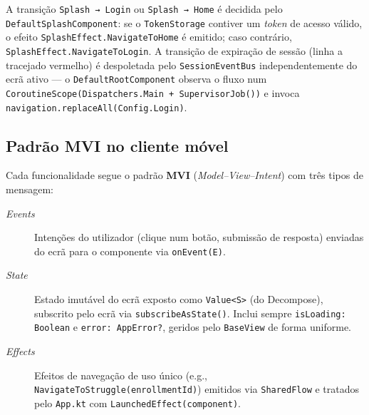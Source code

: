 A transição \texttt{Splash → Login} ou \texttt{Splash → Home} é decidida
pelo \texttt{DefaultSplashComponent}: se o \texttt{TokenStorage} contiver
um \textit{token} de acesso válido, o efeito \texttt{SplashEffect.NavigateToHome}
é emitido; caso contrário, \texttt{SplashEffect.NavigateToLogin}.
A transição de expiração de sessão (linha a tracejado vermelho) é
despoletada pelo \texttt{SessionEventBus} independentemente do ecrã ativo
— o \texttt{DefaultRootComponent} observa o fluxo num
\texttt{CoroutineScope(Dispatchers.Main + SupervisorJob())} e invoca
\texttt{navigation.replaceAll(Config.Login)}.

\subsection*{Padrão MVI no cliente móvel}

Cada funcionalidade segue o padrão \textbf{MVI}
(\textit{Model–View–Intent}) com três tipos de mensagem:

\begin{description}
  \item[\textit{Events}] Intenções do utilizador (clique num botão,
    submissão de resposta) enviadas do ecrã para o componente via
    \texttt{onEvent(E)}.
  \item[\textit{State}] Estado imutável do ecrã exposto como
    \texttt{Value<S>} (do Decompose), subscrito pelo ecrã via
    \texttt{subscribeAsState()}. Inclui sempre \texttt{isLoading: Boolean}
    e \texttt{error: AppError?}, geridos pelo \texttt{BaseView} de forma
    uniforme.
  \item[\textit{Effects}] Efeitos de navegação de uso único (e.g.,
    \texttt{NavigateToStruggle(enrollmentId)}) emitidos via
    \texttt{SharedFlow} e tratados pelo \texttt{App.kt} com
    \texttt{LaunchedEffect(component)}.
\end{description}

